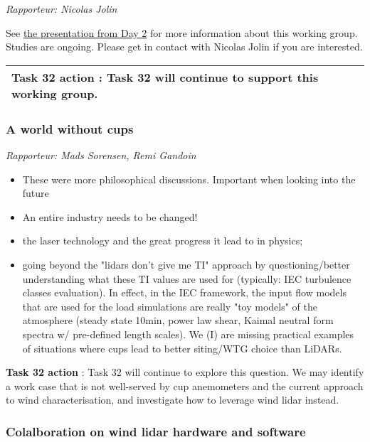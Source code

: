 \emph{Rapporteur: Nicolas Jolin}

See \protect\hyperlink{_89scdv7d3yn6}{the presentation from Day 2} for
more information about this working group. Studies are ongoing. Please
get in contact with Nicolas Jolin if you are interested.

\begin{longtable}[]{@{}l@{}}
\toprule
\textbf{Task 32 action} : Task 32 will continue to support this working
group.\tabularnewline
\midrule
\endhead
\bottomrule
\end{longtable}

\hypertarget{a-world-without-cups}{%
\subsubsection{A world without cups}\label{a-world-without-cups}}

\emph{Rapporteur: Mads Sorensen, Remi Gandoin}

\begin{itemize}
\tightlist
\item
  These were more philosophical discussions. Important when looking into
  the future
\item
  An entire industry needs to be changed!

\item
  the laser technology and the great progress it lead to in physics;
\item
  going beyond the "lidars don't give me TI" approach by
  questioning/better understanding what these TI values are used for
  (typically: IEC turbulence classes evaluation). In effect, in the IEC
  framework, the input flow models that are used for the load
  simulations are really "toy models" of the atmosphere (steady state
  10min, power law shear, Kaimal neutral form spectra w/ pre-defined
  length scales). We (I) are missing practical examples of situations
  where cups lead to better siting/WTG choice than LiDARs.
\end{itemize}

\textbf{Task 32 action} : Task 32 will continue to explore this
question. We may identify a work case that is not well-served by cup
anemometers and the current approach to wind characterisation, and
investigate how to leverage wind lidar instead.

\subsubsection{Colalboration on wind lidar hardware and software}

